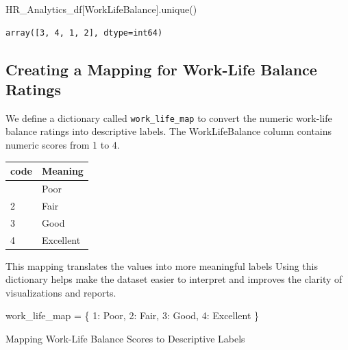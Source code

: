 \documentclass[
  letterpaper,
  DIV=11,
  numbers=noendperiod]{scrartcl}
\newenvironment{Shaded}{\begin{snugshade}}{\end{snugshade}}
\newcommand{\DecValTok}[1]{\textcolor[rgb]{0.68,0.00,0.00}{#1}}
\newcommand{\NormalTok}[1]{\textcolor[rgb]{0.00,0.23,0.31}{#1}}
\newcommand{\OperatorTok}[1]{\textcolor[rgb]{0.37,0.37,0.37}{#1}}
\newcommand{\StringTok}[1]{\textcolor[rgb]{0.13,0.47,0.30}{#1}}
\begin{document}
\begin{Shaded}
\begin{Highlighting}[]
\NormalTok{HR\_Analytics\_df[}\StringTok{\textquotesingle{}WorkLifeBalance\textquotesingle{}}\NormalTok{].unique()}
\end{Highlighting}
\end{Shaded}

\begin{verbatim}
array([3, 4, 1, 2], dtype=int64)
\end{verbatim}

\subsection{Creating a Mapping for Work-Life Balance
Ratings}\label{creating-a-mapping-for-work-life-balance-ratings}

We define a dictionary called \texttt{work\_life\_map} to convert the
numeric work-life balance ratings into descriptive labels. The
WorkLifeBalance column contains numeric scores from 1 to 4.

\begin{longtable}[]{@{}ll@{}}
\toprule\noalign{}
code & Meaning \\
\midrule\noalign{}
\endhead
\bottomrule\noalign{}
\endlastfoot
1 & Poor \\
2 & Fair \\
3 & Good \\
4 & Excellent \\
\end{longtable}

This mapping translates the values into more meaningful labels Using
this dictionary helps make the dataset easier to interpret and improves
the clarity of visualizations and reports.

\begin{Shaded}
\begin{Highlighting}[]
\NormalTok{work\_life\_map }\OperatorTok{=}\NormalTok{ \{}
    \DecValTok{1}\NormalTok{: }\StringTok{\textquotesingle{}Poor\textquotesingle{}}\NormalTok{,}
    \DecValTok{2}\NormalTok{: }\StringTok{\textquotesingle{}Fair\textquotesingle{}}\NormalTok{,}
    \DecValTok{3}\NormalTok{: }\StringTok{\textquotesingle{}Good\textquotesingle{}}\NormalTok{,}
    \DecValTok{4}\NormalTok{: }\StringTok{\textquotesingle{}Excellent\textquotesingle{}}
\NormalTok{\}}
\end{Highlighting}
\end{Shaded}

Mapping Work-Life Balance Scores to Descriptive Labels
\end{document}

